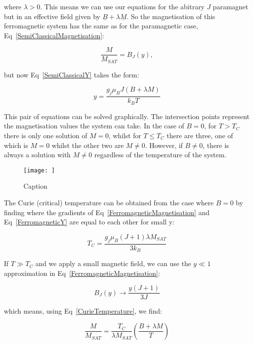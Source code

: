 \noindent where $\lambda > 0$. This means we can use our equations for the abitrary $J$ paramagnet but in an effective field given by $\underline{B} + \lambda \underline{M}$. So the magnetisation of this ferromagnetic system has the same as for the paramagnetic case, Eq~\ref{SemiClassicalMagnetisation}:

\begin{equation}
    \frac{M}{M_{SAT}} = B_J(y)
    \label{FerromagneticMagnetisation},
\end{equation}

\noindent but now Eq~\ref{SemiClassicalY} takes the form:

\begin{equation}
    y = \frac{g_j \mu_B J (B + \lambda M)}{k_B T}
    \label{FerromagneticY}
\end{equation}

\noindent This pair of equations can be solved graphically. The intersection points represent the magnetisation values the system can take. In the case of $B = 0$, for $T > T_C$ there is only one solution of $M = 0$, whilst for $T \leq T_C$ there are three, one of which is $M = 0$ whilst the other two are $M \neq 0$.
However, if $B \neq 0$, there is always a solution with $M \neq 0$ regardless of the temperature of the system.

\begin{figure}
    \centering
    \texttt{[image: ]}
    \caption{Caption}
    \label{fig:enter-label}
\end{figure}

\noindent The Curie (critical) temperature can be obtained from the case where $B = 0$ by finding where the gradients of Eq~\ref{FerromagneticMagnetisation} and Eq~\ref{FerromagneticY} are equal to each other for small y:

\begin{equation}
    T_C = \frac{g_j \mu_B (J + 1) \lambda M_{SAT}}{3 k_B}
    \label{CurieTemperature}
\end{equation}

\noindent If $T\gg T_C$ and we apply a small magnetic field, we can use the $y\ll1$ approximation in Eq~\ref{FerromagneticMagnetisation}:

\begin{equation}
    B_J(y) \rightarrow \frac{y (J + 1)}{3J}
\end{equation}

\noindent which means, using Eq~\ref{CurieTemperature}, we find:

\begin{equation}
    \frac{M}{M_{SAT}} = \frac{T_C}{\lambda M_{SAT}} (\frac{B + \lambda M}{T})
    \label{ApproximatedFerromagneticMagnetisation}
\end{equation}

